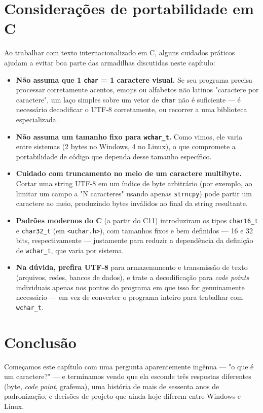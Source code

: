 \section*{Considerações de portabilidade em C}

Ao trabalhar com texto internacionalizado em C, alguns cuidados práticos ajudam a evitar boa parte das armadilhas discutidas neste capítulo:

\begin{itemize}
    \item \textbf{Não assuma que 1 \texttt{char} = 1 caractere visual.} Se seu programa precisa processar corretamente acentos, emojis ou alfabetos não latinos "caractere por caractere", um laço simples sobre um vetor de \texttt{char} não é suficiente — é necessário decodificar o UTF-8 corretamente, ou recorrer a uma biblioteca especializada.
    \item \textbf{Não assuma um tamanho fixo para \texttt{wchar\_t}.} Como vimos, ele varia entre sistemas (2 bytes no Windows, 4 no Linux), o que compromete a portabilidade de código que dependa desse tamanho específico.
    \item \textbf{Cuidado com truncamento no meio de um caractere multibyte.} Cortar uma string UTF-8 em um índice de byte arbitrário (por exemplo, ao limitar um campo a "N caracteres" usando apenas \texttt{strncpy}) pode partir um caractere ao meio, produzindo bytes inválidos ao final da string resultante.
    \item \textbf{Padrões modernos do C} (a partir do C11) introduziram os tipos \texttt{char16\_t} e \texttt{char32\_t} (em \texttt{<uchar.h>}), com tamanhos fixos e bem definidos — 16 e 32 bits, respectivamente — justamente para reduzir a dependência da definição de \texttt{wchar\_t}, que varia por sistema.
    \item \textbf{Na dúvida, prefira UTF-8} para armazenamento e transmissão de texto (arquivos, redes, bancos de dados), e trate a decodificação para \textit{code points} individuais apenas nos pontos do programa em que isso for genuinamente necessário — em vez de converter o programa inteiro para trabalhar com \texttt{wchar\_t}.
\end{itemize}

\section*{Conclusão}

Começamos este capítulo com uma pergunta aparentemente ingênua — "o que é um caractere?" — e terminamos vendo que ela esconde três respostas diferentes (byte, \textit{code point}, grafema), uma história de mais de sessenta anos de padronização, e decisões de projeto que ainda hoje diferem entre Windows e Linux.

